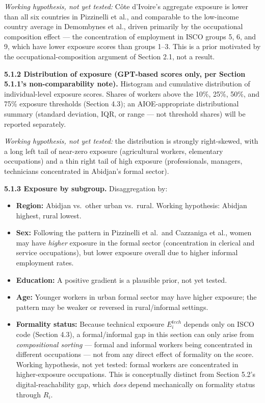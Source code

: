 \documentclass[
  11pt,
]{article}
\providecommand{\tightlist}{%
  \setlength{\itemsep}{0pt}\setlength{\parskip}{0pt}}
\begin{document}
\emph{Working hypothesis, not yet tested:} Côte d'Ivoire's aggregate
exposure is lower than all six countries in Pizzinelli et al., and
comparable to the low-income country average in Demombynes et al.,
driven primarily by the occupational composition effect --- the
concentration of employment in ISCO groups 5, 6, and 9, which have lower
exposure scores than groups 1--3. This is a prior motivated by the
occupational-composition argument of Section 2.1, not a result.

\textbf{5.1.2 Distribution of exposure (GPT-based scores only, per
Section 5.1.1's non-comparability note).} Histogram and cumulative
distribution of individual-level exposure scores. Shares of workers
above the 10\%, 25\%, 50\%, and 75\% exposure thresholds (Section 4.3);
an AIOE-appropriate distributional summary (standard deviation, IQR, or
range --- not threshold shares) will be reported separately.

\emph{Working hypothesis, not yet tested:} the distribution is strongly
right-skewed, with a long left tail of near-zero exposure (agricultural
workers, elementary occupations) and a thin right tail of high exposure
(professionals, managers, technicians concentrated in Abidjan's formal
sector).

\textbf{5.1.3 Exposure by subgroup.} Disaggregation by:

\begin{itemize}
\tightlist
\item
  \textbf{Region:} Abidjan vs.~other urban vs.~rural. Working
  hypothesis: Abidjan highest, rural lowest.
\item
  \textbf{Sex:} Following the pattern in Pizzinelli et al.~and Cazzaniga
  et al., women may have \emph{higher} exposure in the formal sector
  (concentration in clerical and service occupations), but lower
  exposure overall due to higher informal employment rates.
\item
  \textbf{Education:} A positive gradient is a plausible prior, not yet
  tested.
\item
  \textbf{Age:} Younger workers in urban formal sector may have higher
  exposure; the pattern may be weaker or reversed in rural/informal
  settings.
\item
  \textbf{Formality status:} Because technical exposure \(E_i^{tech}\)
  depends only on ISCO code (Section 4.3), a formal/informal gap in this
  section can only arise from \emph{compositional sorting} --- formal
  and informal workers being concentrated in different occupations ---
  not from any direct effect of formality on the score. Working
  hypothesis, not yet tested: formal workers are concentrated in
  higher-exposure occupations. This is conceptually distinct from
  Section 5.2's digital-reachability gap, which \emph{does} depend
  mechanically on formality status through \(R_i\).
\end{itemize}
\end{document}
